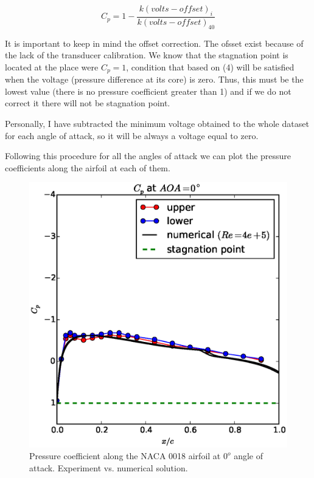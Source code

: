 \documentclass[10pt]{SelfArx} %
\begin{document}
\begin{equation} C_{p} = 1 - \frac{k (volts - offset)_{i}}{k (volts - offset)_{40}} \end{equation}
 
It is important to keep in mind the offset correction. The ofsset exist because of the lack of the transducer calibration. We know that the stagnation point is located at the place were $C_{p} = 1$, condition that based on (4) will be satisfied when the voltage (pressure difference at its core) is zero. Thus, this must be the lowest value (there is no pressure coefficient greater than 1) and if we do not correct it there will not be stagnation point.

Personally, I have subtracted the minimum voltage obtained to the whole dataset for each angle of attack, so it will be always a voltage equal to zero.

Following this procedure for all the angles of attack we can plot the pressure coefficients along the airfoil at each of them.

\begin{figure}[ht!]
\centering
\includegraphics[scale=0.55]{plots/compared-cp-at-aoa0.eps} 
\caption{Pressure coefficient along the NACA 0018 airfoil at $0^{o}$ angle of attack. Experiment vs. numerical solution. }
\end{figure}
\end{document}
